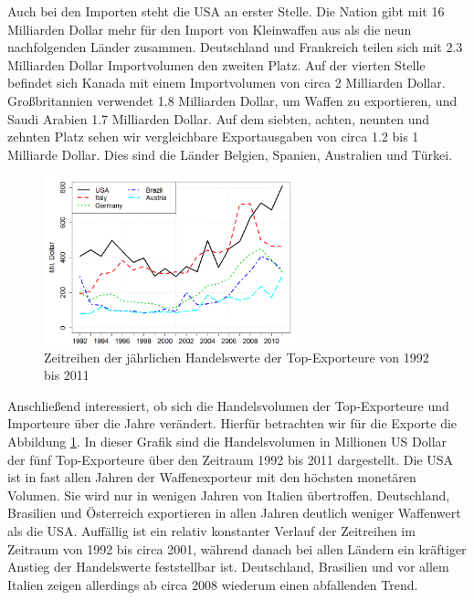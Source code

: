 \documentclass[a4paper,ngerman,oneside,titlepage,bibliography=totoc,11pt]{scrreprt}
\begin{document}
		
Auch bei den Importen steht die USA an erster Stelle. Die Nation gibt mit 16 Milliarden Dollar mehr für den Import von Kleinwaffen aus als die neun nachfolgenden Länder zusammen. Deutschland und Frankreich teilen sich mit 2.3 Milliarden Dollar Importvolumen den zweiten Platz. Auf der vierten Stelle befindet sich Kanada mit einem Importvolumen von circa 2 Milliarden Dollar. Großbritannien verwendet 1.8 Milliarden Dollar, um Waffen zu exportieren, und Saudi Arabien 1.7 Milliarden Dollar. Auf dem siebten, achten, neunten und zehnten Platz sehen wir vergleichbare Exportausgaben von circa 1.2 bis 1 Milliarde Dollar. Dies sind die Länder Belgien, Spanien, Australien und Türkei.

\begin{figure}[h]
\centering
	\includegraphics[width=0.65\textwidth]{Grafiken/ts_topsexp.png}
	\caption{Zeitreihen der jährlichen Handelswerte der Top-Exporteure von 1992 bis 2011}
	\label{fig:ts_tops1}
\end{figure}




Anschließend interessiert, ob sich die Handelsvolumen der Top-Exporteure und Importeure über die Jahre verändert. Hierfür betrachten wir für die Exporte die Abbildung \ref{fig:ts_tops1}.
In dieser Grafik sind die Handelsvolumen in Millionen US Dollar der fünf Top-Exporteure über den Zeitraum 1992 bis 2011 dargestellt. Die USA ist in fast allen Jahren der Waffenexporteur mit den höchsten monetären Volumen. Sie wird nur in wenigen Jahren von Italien übertroffen. Deutschland, Brasilien und Österreich exportieren in allen Jahren deutlich weniger Waffenwert als die USA. Auffällig ist ein relativ konstanter Verlauf der Zeitreihen im Zeitraum von 1992 bis circa 2001, während danach bei allen Ländern ein kräftiger Anstieg der Handelswerte feststellbar ist. Deutschland, Brasilien und vor allem Italien zeigen allerdings ab circa 2008 wiederum einen abfallenden Trend.
\end{document}
